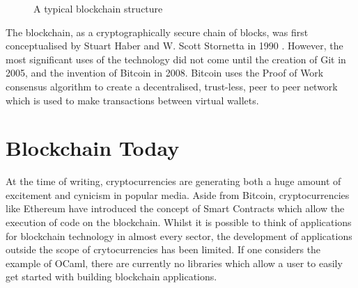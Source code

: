 \documentclass[12pt,a4paper,twoside,openright]{report}
\begin{document}
	\begin{figure}
		\begin{center}
			\end{center}
		\caption{A typical blockchain structure}
		\label{fig:mainblockchain}
	\end{figure}
	The blockchain, as a cryptographically secure chain of blocks, was first conceptualised by Stuart Haber and W. Scott Stornetta in 1990 \cite{HaberStornetta}.
	However, the most significant uses of the technology did not come until the creation of Git \cite{Git} in 2005, and the invention of Bitcoin \cite{Bitcoin} in 2008.
	Bitcoin uses the Proof of Work consensus algorithm to create a decentralised, trust-less, peer to peer network which is used to make transactions between virtual wallets.

	\section{Blockchain Today}
	At the time of writing, cryptocurrencies are generating both a huge amount of excitement and cynicism in popular media. 
	Aside from Bitcoin, cryptocurrencies like Ethereum \cite{Ethereum} have introduced the concept of Smart Contracts which allow the execution of code on the blockchain.
	Whilst it is possible to think of applications for blockchain technology in almost every sector, the development of applications outside the scope of crytocurrencies has been limited. 
	If one considers the example of OCaml, there are currently no libraries which allow a user to easily get started with building blockchain applications. \\
\end{document}

